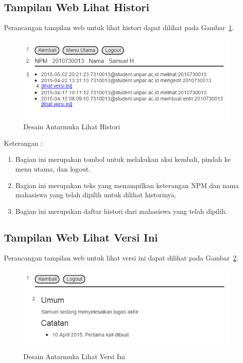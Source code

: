 \subsection{Tampilan Web Lihat Histori}
Perancangan tampilan web untuk lihat histori dapat dilihat pada Gambar~\ref{fig:lihathistori}.
\begin{figure}[H]
\centering
\includegraphics[scale=0.5]{Gambar/lihathistori.png}
\caption[Desain Antarmuka Lihat Histori]{Desain Antarmuka Lihat Histori}
\label{fig:lihathistori}
\end{figure}

Keterangan :
\begin{enumerate}[(1)]
\item
Bagian ini merupakan tombol untuk melakukan aksi kembali, pindah ke menu utama,
dan logout.
\item
Bagian ini merupakan teks yang menampilkan keterangan NPM dan nama mahasiswa
yang telah dipilih untuk dilihat historinya.
\item
Bagian ini merupakan daftar histori dari mahasiswa yang telah dipilih.
\end{enumerate}

\subsection{Tampilan Web Lihat Versi Ini}
Perancangan tampilan web untuk lihat versi ini dapat dilihat pada
Gambar~\ref{fig:lihatversiini}.
\begin{figure}[H]
\centering
\includegraphics[scale=0.5]{Gambar/lihatversiini.png}
\caption[Desain Antarmuka Lihat Versi Ini]{Desain Antarmuka Lihat Versi Ini}
\label{fig:lihatversiini}
\end{figure}

